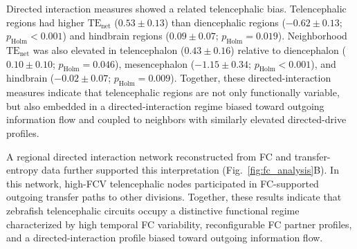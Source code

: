 \documentclass[9pt,twocolumn,twoside]{pnas-new}
\begin{document}
Directed interaction measures showed a related telencephalic bias. Telencephalic regions had higher $\mathrm{TE}_{\mathrm{net}}$ ($0.53 \pm 0.13$) than diencephalic regions ($-0.62 \pm 0.13$; $p_{\mathrm{Holm}} < 0.001$) and hindbrain regions ($0.09 \pm 0.07$; $p_{\mathrm{Holm}} = 0.019$). Neighborhood $\mathrm{TE}_{\mathrm{net}}$ was also elevated in telencephalon ($0.43 \pm 0.16$) relative to diencephalon ($0.10 \pm 0.10$; $p_{\mathrm{Holm}} = 0.046$), mesencephalon ($-1.15 \pm 0.34$; $p_{\mathrm{Holm}} < 0.001$), and hindbrain ($-0.02 \pm 0.07$; $p_{\mathrm{Holm}} = 0.009$). Together, these directed-interaction measures indicate that telencephalic regions are not only functionally variable, but also embedded in a directed-interaction regime biased toward outgoing information flow and coupled to neighbors with similarly elevated directed-drive profiles.

A regional directed interaction network reconstructed from FC and transfer-entropy data further supported this interpretation (Fig.~\ref{fig:fc_analysis}B). In this network, high-FCV telencephalic nodes participated in FC-supported outgoing transfer paths to other divisions. Together, these results indicate that zebrafish telencephalic circuits occupy a distinctive functional regime characterized by high temporal FC variability, reconfigurable FC partner profiles, and a directed-interaction profile biased toward outgoing information flow.
\end{document}

